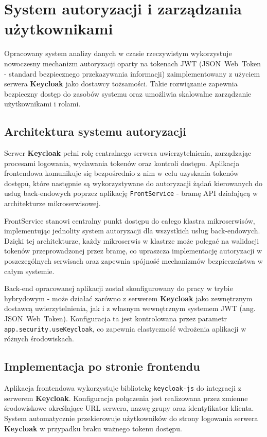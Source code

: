 \section{System autoryzacji i zarządzania użytkownikami}
\label{chap:autoryzacja}

Opracowany system analizy danych w czasie rzeczywistym wykorzystuje nowoczesny mechanizm autoryzacji oparty na tokenach \mbox{JWT} (\mbox{JSON Web Token} - standard bezpiecznego przekazywania informacji) zaimplementowany z użyciem serwera \textbf{Keycloak} jako dostawcy tożsamości. Takie rozwiązanie zapewnia bezpieczny dostęp do zasobów systemu oraz umożliwia skalowalne zarządzanie użytkownikami i rolami.

\subsection{Architektura systemu autoryzacji}

Serwer \textbf{Keycloak} pełni rolę centralnego serwera uwierzytelnienia, zarządzając procesami logowania, wydawania tokenów oraz kontroli dostępu. Aplikacja frontendowa komunikuje się bezpośrednio z nim w celu uzyskania tokenów dostępu, które następnie są wykorzystywane do autoryzacji żądań kierowanych do usług back-endowych poprzez aplikację \texttt{FrontService} - bramę API działającą w architekturze mikroserwisowej.

FrontService stanowi centralny punkt dostępu do całego klastra mikroserwisów, implementując jednolity system autoryzacji dla wszystkich usług back-endowych. Dzięki tej architekturze, każdy mikroserwis w klastrze może polegać na walidacji tokenów przeprowadzonej przez bramę, co upraszcza implementację autoryzacji w poszczególnych serwisach oraz zapewnia spójność mechanizmów bezpieczeństwa w całym systemie.

Back-end opracowanej aplikacji został skonfigurowany do pracy w trybie hybrydowym - może działać zarówno z serwerem \textbf{Keycloak} jako zewnętrznym dostawcą uwierzytelnienia, jak i z własnym wewnętrznym systemem \mbox{JWT} (ang. \mbox{JSON Web Token}). Konfiguracja ta jest kontrolowana przez parametr \texttt{app.security.useKeycloak}, co zapewnia elastyczność wdrożenia aplikacji w różnych środowiskach.

\subsection{Implementacja po stronie frontendu}

Aplikacja frontendowa wykorzystuje bibliotekę \texttt{keycloak-js} do integracji z serwerem \textbf{Keycloak}. Konfiguracja połączenia jest realizowana przez zmienne środowiskowe określające URL serwera, nazwę grupy oraz identyfikator klienta. System automatycznie przekierowuje użytkowników do strony logowania serwera \textbf{Keycloak} w przypadku braku ważnego tokenu dostępu.


